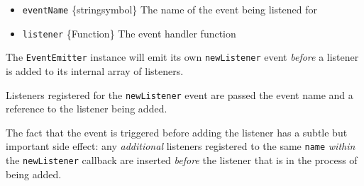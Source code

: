 \begin{itemize}
\tightlist
\item
  \texttt{eventName} \{string\textbar symbol\} The name of the event
  being listened for
\item
  \texttt{listener} \{Function\} The event handler function
\end{itemize}

The \texttt{EventEmitter} instance will emit its own
\texttt{\textquotesingle{}newListener\textquotesingle{}} event
\emph{before} a listener is added to its internal array of listeners.

Listeners registered for the
\texttt{\textquotesingle{}newListener\textquotesingle{}} event are
passed the event name and a reference to the listener being added.

The fact that the event is triggered before adding the listener has a
subtle but important side effect: any \emph{additional} listeners
registered to the same \texttt{name} \emph{within} the
\texttt{\textquotesingle{}newListener\textquotesingle{}} callback are
inserted \emph{before} the listener that is in the process of being
added.

